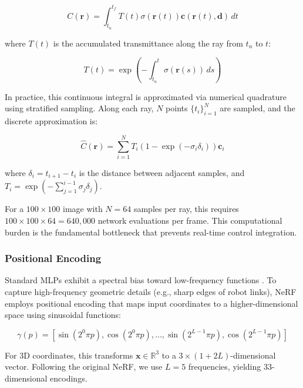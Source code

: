\documentclass[12pt,a4paper,oneside]{report}
\begin{document}
\begin{equation}
C(\mathbf{r}) = \int_{t_n}^{t_f} T(t) \sigma(\mathbf{r}(t)) \mathbf{c}(\mathbf{r}(t), \mathbf{d}) \, dt
\end{equation}

where $T(t)$ is the accumulated transmittance along the ray from $t_n$ to $t$:

\begin{equation}
T(t) = \exp\left(-\int_{t_n}^{t} \sigma(\mathbf{r}(s)) \, ds\right)
\end{equation}

In practice, this continuous integral is approximated via numerical quadrature using stratified sampling. Along each ray, $N$ points $\{t_i\}_{i=1}^N$ are sampled, and the discrete approximation is:

\begin{equation}
\hat{C}(\mathbf{r}) = \sum_{i=1}^{N} T_i (1 - \exp(-\sigma_i \delta_i)) \mathbf{c}_i
\end{equation}

where $\delta_i = t_{i+1} - t_i$ is the distance between adjacent samples, and $T_i = \exp\left(-\sum_{j=1}^{i-1} \sigma_j \delta_j\right)$.

For a $100 \times 100$ image with $N = 64$ samples per ray, this requires $100 \times 100 \times 64 = 640,000$ network evaluations per frame. This computational burden is the fundamental bottleneck that prevents real-time control integration.

\subsubsection{Positional Encoding}

Standard MLPs exhibit a spectral bias toward low-frequency functions \cite{rahaman2019spectral}. To capture high-frequency geometric details (e.g., sharp edges of robot links), NeRF employs positional encoding that maps input coordinates to a higher-dimensional space using sinusoidal functions:

\begin{equation}
\gamma(p) = [\sin(2^0 \pi p), \cos(2^0 \pi p), \ldots, \sin(2^{L-1} \pi p), \cos(2^{L-1} \pi p)]
\end{equation}

For 3D coordinates, this transforms $\mathbf{x} \in \mathbb{R}^3$ to a $3 \times (1 + 2L)$-dimensional vector. Following the original NeRF, we use $L = 5$ frequencies, yielding 33-dimensional encodings.
\end{document}
